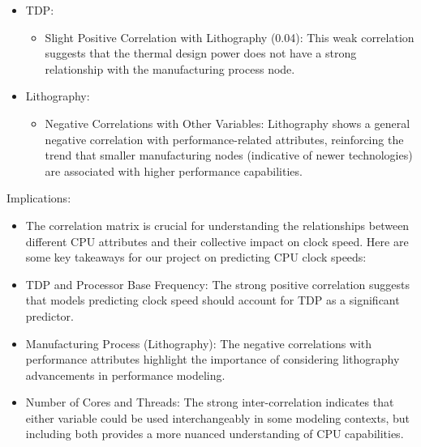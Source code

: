 \begin{itemize}
    \item TDP:
    \begin{itemize}
        \item Slight Positive Correlation with Lithography (0.04): This weak correlation suggests that the thermal design power does not have a strong relationship with the manufacturing process node.
    \end{itemize}
    
    \item Lithography:
    \begin{itemize}
        \item Negative Correlations with Other Variables: Lithography shows a general negative correlation with performance-related attributes, reinforcing the trend that smaller manufacturing nodes (indicative of newer technologies) are associated with higher performance capabilities.
    \end{itemize}
\end{itemize}

Implications:
\begin{itemize}
    \item The correlation matrix is crucial for understanding the relationships between different CPU attributes and their collective impact on clock speed. Here are some key takeaways for our project on predicting CPU clock speeds:
    
    \item TDP and Processor Base Frequency: The strong positive correlation suggests that models predicting clock speed should account for TDP as a significant predictor.
    
    \item Manufacturing Process (Lithography): The negative correlations with performance attributes highlight the importance of considering lithography advancements in performance modeling.
    
    \item Number of Cores and Threads: The strong inter-correlation indicates that either variable could be used interchangeably in some modeling contexts, but including both provides a more nuanced understanding of CPU capabilities.
\end{itemize}


\newpage